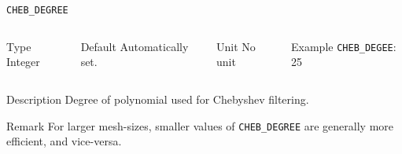 \documentclass[xcolor=dvipsnames,t]{beamer}
\begin{document}
\begin{frame}[allowframebreaks]{\texttt{CHEB\_DEGREE}} \label{CHEB_DEGREE}
\vspace*{-12pt}
\begin{columns}
\begin{block}{Type}
Integer
\end{block}

\begin{block}{Default}
Automatically set.
\end{block}

\begin{block}{Unit}
No unit
\end{block}

\begin{block}{Example}
\texttt{CHEB\_DEGEE}: 25
\end{block}
\end{columns}

\begin{block}{Description}
Degree of polynomial used for Chebyshev filtering. 
\end{block}

\begin{block}{Remark}
For larger mesh-sizes, smaller values of \texttt{CHEB\_DEGREE} are generally more efficient, and vice-versa.
\end{block}

\end{frame}
\end{document}
